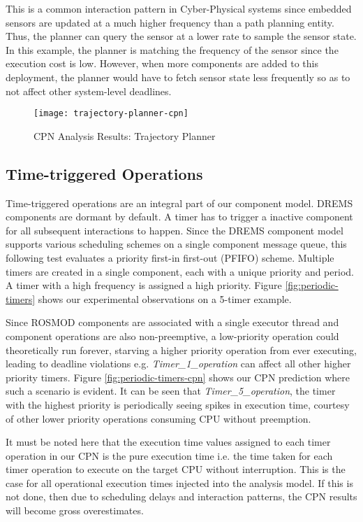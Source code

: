 This is a common interaction pattern in Cyber-Physical systems since embedded sensors are updated at a much higher frequency than a path planning entity. Thus, the planner can query the sensor at a lower rate to sample the sensor state. In this example, the planner is matching the frequency of the sensor since the execution cost is low. However, when more components are added to this deployment, the planner would have to fetch sensor state less frequently so as to not affect other system-level deadlines.  

\begin{figure}[h]
	\centering
	\texttt{[image: trajectory-planner-cpn]}
	\caption{CPN Analysis Results: Trajectory Planner}
	\label{fig:trajectory-planner-cpn}
\end{figure}
\FloatBarrier

\subsection{Time-triggered Operations}

Time-triggered operations are an integral part of our component model. DREMS components are dormant by default. A timer has to trigger a inactive component for all subsequent interactions to happen. Since the DREMS component model supports various scheduling schemes on a single component message queue, this following test evaluates a priority first-in first-out (PFIFO) scheme. Multiple timers are created in a single component, each with a unique priority and period. A timer with a high frequency is assigned a high priority. Figure \ref{fig:periodic-timers} shows our experimental observations on a 5-timer example. 

Since ROSMOD components are associated with a single executor thread and component operations are also non-preemptive, a low-priority operation could theoretically run forever, starving a higher priority operation from ever executing, leading to deadline violations e.g. \emph{Timer\_1\_operation} can affect all other higher priority timers. Figure \ref{fig:periodic-timers-cpn} shows our CPN prediction where such a scenario is evident. It can be seen that \emph{Timer\_5\_operation}, the timer with the highest priority is periodically seeing spikes in execution time, courtesy of other lower priority operations consuming CPU without preemption.

It must be noted here that the execution time values assigned to each timer operation in our CPN is the pure execution time i.e. the time taken for each timer operation to execute on the target CPU without interruption. This is the case for all operational execution times injected into the analysis model. If this is not done, then due to scheduling delays and interaction patterns, the CPN results will become gross overestimates. 

